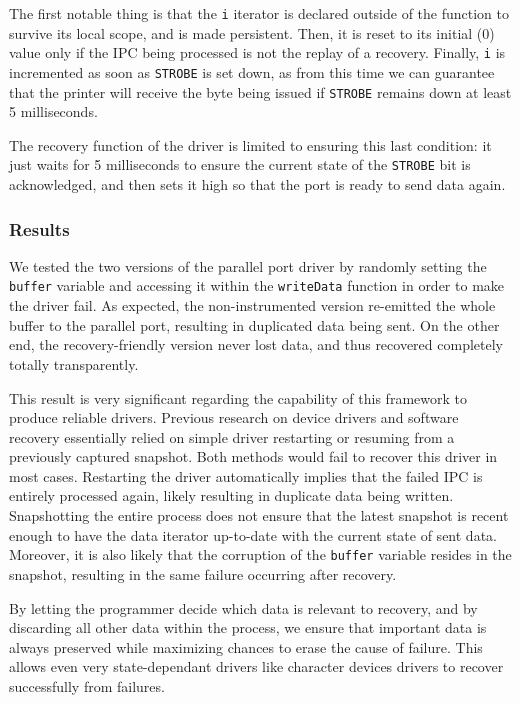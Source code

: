 \documentclass{acm_proc_article-sp}
\begin{document}
The first notable thing is that the \texttt{i} iterator is declared outside of the function to survive its local scope, and is made persistent. Then, it is reset to its initial (0) value only if the IPC being processed is not the replay of a recovery. Finally, \texttt{i} is incremented as soon as \texttt{STROBE} is set down, as from this time we can guarantee that the printer will receive the byte being issued if \texttt{STROBE} remains down at least 5 milliseconds.

The recovery function of the driver is limited to ensuring this last condition: it just waits for 5 milliseconds to ensure the current state of the \texttt{STROBE} bit is acknowledged, and then sets it high so that the port is ready to send data again.

\subsubsection{Results}
We tested the two versions of the parallel port driver by randomly setting the \texttt{buffer} variable and accessing it within the \texttt{writeData} function in order to make the driver fail. As expected, the non-instrumented version re-emitted the whole buffer to the parallel port, resulting in duplicated data being sent. On the other end, the recovery-friendly version never lost data, and thus recovered completely totally transparently.

This result is very significant regarding the capability of this framework to produce reliable drivers. Previous research on device drivers and software recovery essentially relied on simple driver restarting or resuming from a previously captured snapshot. Both methods would fail to recover this driver in most cases. Restarting the driver automatically implies that the failed IPC is entirely processed again, likely resulting in duplicate data being written. Snapshotting the entire process does not ensure that the latest snapshot is recent enough to have the data iterator up-to-date with the current state of sent data. Moreover, it is also likely that the corruption of the \texttt{buffer} variable resides in the snapshot, resulting in the same failure occurring after recovery.

By letting the programmer decide which data is relevant to recovery, and by discarding all other data within the process, we ensure that important data is always preserved while maximizing chances to erase the cause of failure. This allows even very state-dependant drivers like character devices drivers to recover successfully from failures.
\end{document}
